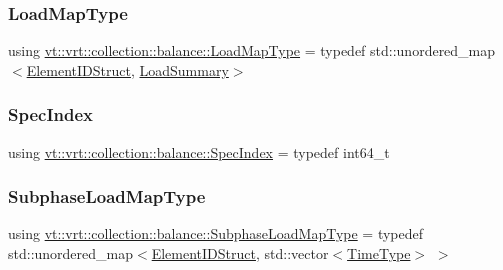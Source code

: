 \mbox{\label{namespacevt_1_1vrt_1_1collection_1_1balance_a5339303db2e1ce964d783a53fd74e6b1}} 
\subsubsection{\texorpdfstring{Load\+Map\+Type}{LoadMapType}}
{\footnotesize\ttfamily using \hyperlink{namespacevt_1_1vrt_1_1collection_1_1balance_a5339303db2e1ce964d783a53fd74e6b1}{vt\+::vrt\+::collection\+::balance\+::\+Load\+Map\+Type} = typedef std\+::unordered\+\_\+map$<$\hyperlink{structvt_1_1vrt_1_1collection_1_1balance_1_1_element_i_d_struct}{Element\+I\+D\+Struct}, \hyperlink{structvt_1_1vrt_1_1collection_1_1balance_1_1_load_summary}{Load\+Summary}$>$}

\mbox{\label{namespacevt_1_1vrt_1_1collection_1_1balance_a72a5e0d9936ddf57f8e6c64e0e9fd123}} 
\subsubsection{\texorpdfstring{Spec\+Index}{SpecIndex}}
{\footnotesize\ttfamily using \hyperlink{namespacevt_1_1vrt_1_1collection_1_1balance_a72a5e0d9936ddf57f8e6c64e0e9fd123}{vt\+::vrt\+::collection\+::balance\+::\+Spec\+Index} = typedef int64\+\_\+t}

\mbox{\label{namespacevt_1_1vrt_1_1collection_1_1balance_a8bdadb2583f128dd256e7d5a10826542}} 
\subsubsection{\texorpdfstring{Subphase\+Load\+Map\+Type}{SubphaseLoadMapType}}
{\footnotesize\ttfamily using \hyperlink{namespacevt_1_1vrt_1_1collection_1_1balance_a8bdadb2583f128dd256e7d5a10826542}{vt\+::vrt\+::collection\+::balance\+::\+Subphase\+Load\+Map\+Type} = typedef std\+::unordered\+\_\+map$<$\hyperlink{structvt_1_1vrt_1_1collection_1_1balance_1_1_element_i_d_struct}{Element\+I\+D\+Struct}, std\+::vector$<$\hyperlink{namespacevt_a876a9d0cd5a952859c72de8a46881442}{Time\+Type}$>$ $>$}



